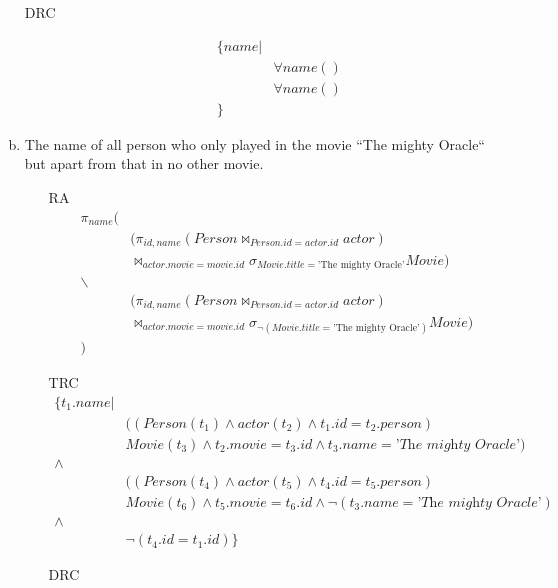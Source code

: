 \documentclass[11pt,a4paper,DIV=9]{scrartcl}
\begin{document}
\begin{enumerate}[a)]
\begin{description}
        \item [DRC]
        \begin{align*}
        \{ name | & \\
                  & \forall name () 
                  & \\
                  & \forall name () \\
        \}
        \end{align*}
      \end{description}
    \item The name of all person who only played in the movie ``The mighty Oracle`` but apart from that in no other movie.\hfill\\
        \begin{enumerate}
          \item [RA]  \begin{align*}
                        \pi_{name} (&\\
                            &(\pi_{id,name}(Person\Join_{Person.id = actor.id}actor)\\
                            &\Join_{actor.movie = movie.id}\sigma_{Movie.title=\textrm{'The mighty Oracle'}}Movie)\\
                         \backslash &\\
                            &(\pi_{id,name}(Person\Join_{Person.id = actor.id}actor)\\
                            &\Join_{actor.movie = movie.id}\sigma_{\neg(Movie.title=\textrm{'The mighty Oracle'})}Movie)\\
                        )
                      \end{align*}
          \item [TRC] \begin{align*}
                      \{ t_1.name | & \\
                      & ((Person(t_1) \wedge actor(t_2) \wedge t_1.id=t_2.person) \\
                      & Movie(t_3) \wedge t_2.movie = t_3.id \wedge t_3.name=\textit{'The mighty Oracle'})\\
                      \wedge\\
                      & ((Person(t_4) \wedge actor(t_5) \wedge t_4.id=t_5.person) \\
                      & Movie(t_6) \wedge t_5.movie = t_6.id \wedge \neg(t_3.name=\textit{'The mighty Oracle'})\\
                      \wedge \\
                     & \neg(t_4.id = t_1.id)
                      \}
                      \end{align*}
          \item [DRC] 
        \end{enumerate}
    \end{enumerate}
\end{document}
